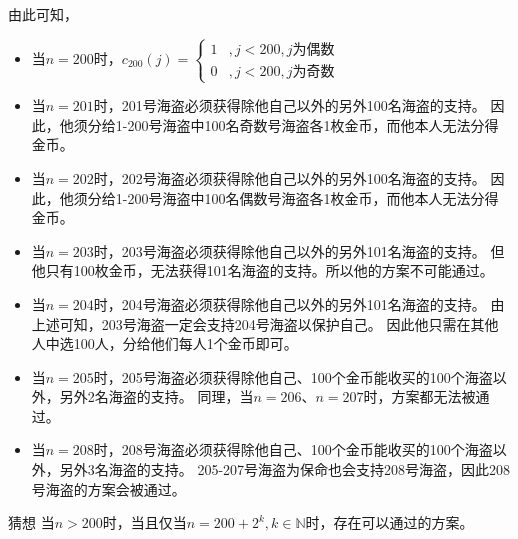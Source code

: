 \documentclass[answers]{exam}
\begin{document}
\begin{questions}
\begin{solution}
        由此可知，
        \begin{itemize}
            \item 当$n=200$时，$
                      c_{200}(j) = \begin{cases}
                          1 & , j<200 , j \text{为偶数} \\
                          0 & , j<200 , j \text{为奇数}
                      \end{cases}
                  $

            \item 当$n=201$时，201号海盗必须获得除他自己以外的另外100名海盗的支持。
                  因此，他须分给1-200号海盗中100名奇数号海盗各1枚金币，而他本人无法分得金币。

            \item 当$n=202$时，202号海盗必须获得除他自己以外的另外100名海盗的支持。
                  因此，他须分给1-200号海盗中100名偶数号海盗各1枚金币，而他本人无法分得金币。

            \item 当$n=203$时，203号海盗必须获得除他自己以外的另外101名海盗的支持。
                  但他只有100枚金币，无法获得101名海盗的支持。所以他的方案不可能通过。

            \item 当$n=204$时，204号海盗必须获得除他自己以外的另外101名海盗的支持。
                  由上述可知，203号海盗一定会支持204号海盗以保护自己。
                  因此他只需在其他人中选100人，分给他们每人1个金币即可。

            \item 当$n=205$时，205号海盗必须获得除他自己、100个金币能收买的100个海盗以外，另外2名海盗的支持。
                  同理，当$n=206$、$n=207$时，方案都无法被通过。

            \item 当$n=208$时，208号海盗必须获得除他自己、100个金币能收买的100个海盗以外，另外3名海盗的支持。
                  205-207号海盗为保命也会支持208号海盗，因此208号海盗的方案会被通过。

        \end{itemize}

        \textsf{猜想} \quad 当$n>200$时，当且仅当$n = 200 + 2^k,k\in \mathbb{N}$时，存在可以通过的方案。


\end{solution}
\end{questions}
\end{document}
